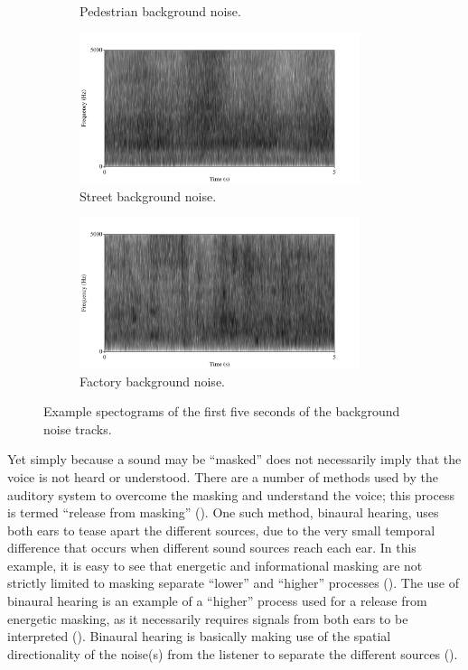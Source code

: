 \documentclass[dissertation,copyright]{uathesis}
\begin{document}
\begin{figure}
\begin{subfigure}{0.5\textwidth}
  \caption{Pedestrian background noise.}
  \label{fig:ped-bkgrnd}
\end{subfigure}
\begin{subfigure}{0.5\textwidth}
  \centering
  \includegraphics[width=0.9\textwidth]{figure/spctgrm-str-background.png}
  \caption{Street background noise.}
  \label{fig:str-bkgrnd}
\end{subfigure}%
\hfill
\begin{subfigure}{0.5\textwidth}
  \centering
  \includegraphics[width=0.9\textwidth]{figure/spctgrm-fac-background.png}
  \caption{Factory background noise.}
  \label{fig:fac-bkgrnd}
\end{subfigure}
\caption{Example spectograms of the first five seconds of the background noise tracks.}
\label{fig:bkgrnd-noises}
\end{figure}

Yet simply because a sound may be ``masked'' does not necessarily imply that the voice is not heard or understood.  There are a number of methods used by the auditory system to overcome the masking and understand the voice; this process is termed ``release from masking'' (\cite{middlebrooks:17}).  One such method, binaural hearing, uses both ears to tease apart the different sources, due to the very small temporal difference that occurs when different sound sources reach each ear.  
In this example, it is easy to see that energetic and informational masking are not strictly limited to masking separate ``lower'' and ``higher'' processes (\cite{durlach:06}).
The use of binaural hearing is an example of a ``higher'' process used for a release from energetic masking, as it necessarily requires signals from both ears to be interpreted (\cite{hirsh:47}). Binaural hearing is basically making use of the spatial directionality of the noise(s) from the listener to separate the different sources (\cite{bregman:94}).
\end{document}
